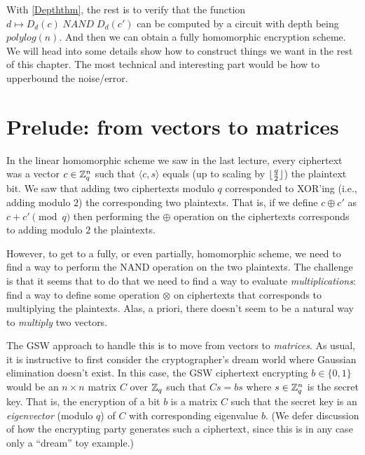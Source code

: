 With \cref{Depththm}, the rest is to verify that the function
\(d \mapsto D_d(c)\; \ensuremath{\mathit{NAND}}\; D_d(c')\) can be
computed by a circuit with depth being \(polylog(n)\). And then we can
obtain a fully homomorphic encryption scheme. We will head into some
details show how to construct things we want in the rest of this
chapter. The most technical and interesting part would be how to
upperbound the noise/error.

\section{Prelude: from vectors to
matrices}\label{Prelude-from-vectors-to-matric}

In the linear homomorphic scheme we saw in the last lecture, every
ciphertext was a vector \(c\in{\mathbb{Z}}_q^n\) such that \(\langle c,s \rangle\)
equals (up to scaling by \(\lfloor \tfrac{q}{2} \rfloor\)) the plaintext bit. We
saw that adding two ciphertexts modulo \(q\) corresponded to XOR'ing
(i.e., adding modulo \(2\)) the corresponding two plaintexts. That is,
if we define \(c \oplus c'\) as \(c+c' \pmod{q}\) then performing the
\(\oplus\) operation on the ciphertexts corresponds to adding modulo
\(2\) the plaintexts.

However, to get to a fully, or even partially, homomorphic scheme, we
need to find a way to perform the NAND operation on the two plaintexts.
The challenge is that it seems that to do that we need to find a way to
evaluate \emph{multiplications}: find a way to define some operation
\(\otimes\) on ciphertexts that corresponds to multiplying the
plaintexts. Alas, a priori, there doesn't seem to be a natural way to
\emph{multiply} two vectors.

The GSW approach to handle this is to move from vectors to
\emph{matrices}. As usual, it is instructive to first consider the
cryptographer's dream world where Gaussian elimination doesn't exist. In
this case, the GSW ciphertext encrypting \(b\in\{0,1\}\) would be an
\(n\times n\) matrix \(C\) over \({\mathbb{Z}}_q\) such that \(Cs = bs\) where
\(s\in{\mathbb{Z}}_q^n\) is the secret key. That is, the encryption of a bit \(b\)
is a matrix \(C\) such that the secret key is an \emph{eigenvector}
(modulo \(q\)) of \(C\) with corresponding eigenvalue \(b\). (We defer
discussion of how the encrypting party generates such a ciphertext,
since this is in any case only a ``dream'' toy example.)



